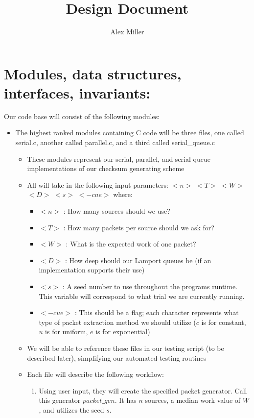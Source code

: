 \documentclass[]{article}
\title{Design Document}
\author{Alex Miller}
\begin{document}
	\maketitle
	

\section{Modules, data structures, interfaces, invariants:}
Our code base will consist of the following modules:
\begin{itemize}
	\item The highest ranked modules containing C code will be three files, one called serial.c, another called parallel.c, and a third called serial\_queue.c
	\begin{itemize}
		\item These modules represent our serial, parallel, and serial-queue implementations of our checksum generating scheme
		\item All will take in the following input parameters: $<n>$ $<T>$ $<W>$ $<D>$ $<s>$ $<-cue>$ where:
		\begin{itemize}
			\item $<n>$ : How many sources should we use?
			\item $<T>$ : How many packets per source should we ask for?
			\item $<W>$ : What is the expected work of one packet?
			\item $<D>$ : How deep should our Lamport queues be (if an implementation supports their use)
			\item $<s>$ : A seed number to use throughout the programs runtime. This variable will correspond to what trial we are currently running.
			\item $<-cue>$ : This should be a flag; each character represents what type of packet extraction method we should utilize ($c$ is for constant, $u$ is for uniform, $e$ is for exponential)
		\end{itemize}
		\item We will be able to reference these files in our testing script (to be described later), simplifying our automated testing routines
		\item Each file will describe the following workflow:
		\begin{enumerate}
			\item Using user input, they will create the specified packet generator. Call this generator $packet\_gen$. It has $n$ sources, a median work value of $W$, and utilizes the seed $s$. 

\end{enumerate}
\end{itemize}
\end{itemize}
\end{document}
